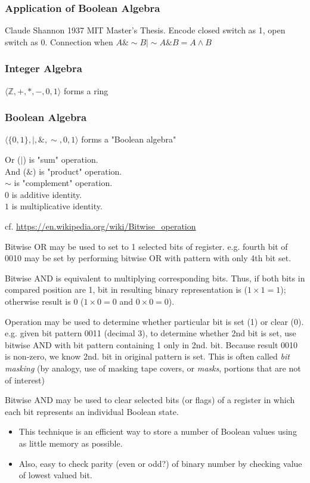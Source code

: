 \documentclass[10pt]{amsart}
\begin{document}
\begin{multicols*}{2}
\subsubsection{Application of Boolean Algebra}

Claude Shannon 1937 MIT Master's Thesis. Encode closed switch as 1, open switch as 0. Connection when $A\& \sim B | \sim A \& B = A \wedge B$

\subsubsection{Integer Algebra}

$\langle \mathbb{Z}, +, *, - , 0 , 1 \rangle$ forms a ring

\subsubsection{Boolean Algebra}

$\langle \lbrace 0, 1 \rbrace , |, \& , \sim, 0, 1 \rangle $ forms a "Boolean algebra"

Or ($|$) is "sum" operation. \\
And ($\&$) is "product" operation. \\
$\sim$ is "complement" operation. \\
$0$ is additive identity. \\
$1$ is multiplicative identity.

cf. \url{https://en.wikipedia.org/wiki/Bitwise_operation}

Bitwise OR may be used to set to 1 selected bits of register. e.g. fourth bit of 0010 may be set by performing bitwise OR with pattern with only 4th bit set.

Bitwise AND is equivalent to multiplying corresponding bits. Thus, if both bits in compared position are 1, bit in resulting binary representation is ($1 \times 1 = 1$); otherwise result is 0 ($1 \times 0 = 0$ and $0 \times 0 = 0$).

Operation may be used to determine whether particular bit is set (1) or clear (0). e.g. given bit pattern 0011 (decimal 3), to determine whether 2nd bit is set, use bitwise AND with bit pattern containing 1 only in 2nd. bit. Because result 0010 is non-zero, we know 2nd. bit in original pattern is set. This is often called \emph{bit masking} (by analogy, use of masking tape covers, or \emph{masks}, portions that are not of interest)

Bitwise AND may be used to clear selected bits (or flags) of a register in which each bit represents an individual Boolean state.
\begin{itemize}
	\item This technique is an efficient way to store a number of Boolean values using as little memory as possible.
	\item Also, easy to check parity (even or odd?) of binary number by checking value of lowest valued bit.
\end{itemize}


\end{multicols*}
\end{document}
